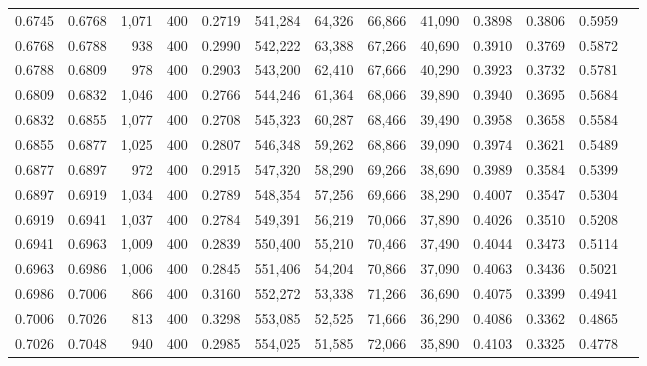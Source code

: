 \begin{tabular}{rrrrrrrrrrrrr}
0.6745 & 0.6768 &  1,071 & 400 &                                     0.2719 & 541,284 &  64,326 &  66,866 &  41,090 & 0.3898 & 0.3806 & 0.5959 \\
0.6768 & 0.6788 &    938 & 400 &                                     0.2990 & 542,222 &  63,388 &  67,266 &  40,690 & 0.3910 & 0.3769 & 0.5872 \\
0.6788 & 0.6809 &    978 & 400 &                                     0.2903 & 543,200 &  62,410 &  67,666 &  40,290 & 0.3923 & 0.3732 & 0.5781 \\
0.6809 & 0.6832 &  1,046 & 400 &                                     0.2766 & 544,246 &  61,364 &  68,066 &  39,890 & 0.3940 & 0.3695 & 0.5684 \\
0.6832 & 0.6855 &  1,077 & 400 &                                     0.2708 & 545,323 &  60,287 &  68,466 &  39,490 & 0.3958 & 0.3658 & 0.5584 \\
0.6855 & 0.6877 &  1,025 & 400 &                                     0.2807 & 546,348 &  59,262 &  68,866 &  39,090 & 0.3974 & 0.3621 & 0.5489 \\
0.6877 & 0.6897 &    972 & 400 &                                     0.2915 & 547,320 &  58,290 &  69,266 &  38,690 & 0.3989 & 0.3584 & 0.5399 \\
0.6897 & 0.6919 &  1,034 & 400 &                                     0.2789 & 548,354 &  57,256 &  69,666 &  38,290 & 0.4007 & 0.3547 & 0.5304 \\
0.6919 & 0.6941 &  1,037 & 400 &                                     0.2784 & 549,391 &  56,219 &  70,066 &  37,890 & 0.4026 & 0.3510 & 0.5208 \\
0.6941 & 0.6963 &  1,009 & 400 &                                     0.2839 & 550,400 &  55,210 &  70,466 &  37,490 & 0.4044 & 0.3473 & 0.5114 \\
0.6963 & 0.6986 &  1,006 & 400 &                                     0.2845 & 551,406 &  54,204 &  70,866 &  37,090 & 0.4063 & 0.3436 & 0.5021 \\
0.6986 & 0.7006 &    866 & 400 &                                     0.3160 & 552,272 &  53,338 &  71,266 &  36,690 & 0.4075 & 0.3399 & 0.4941 \\
0.7006 & 0.7026 &    813 & 400 &                                     0.3298 & 553,085 &  52,525 &  71,666 &  36,290 & 0.4086 & 0.3362 & 0.4865 \\
0.7026 & 0.7048 &    940 & 400 &                                     0.2985 & 554,025 &  51,585 &  72,066 &  35,890 & 0.4103 & 0.3325 & 0.4778 \\

\end{tabular}
